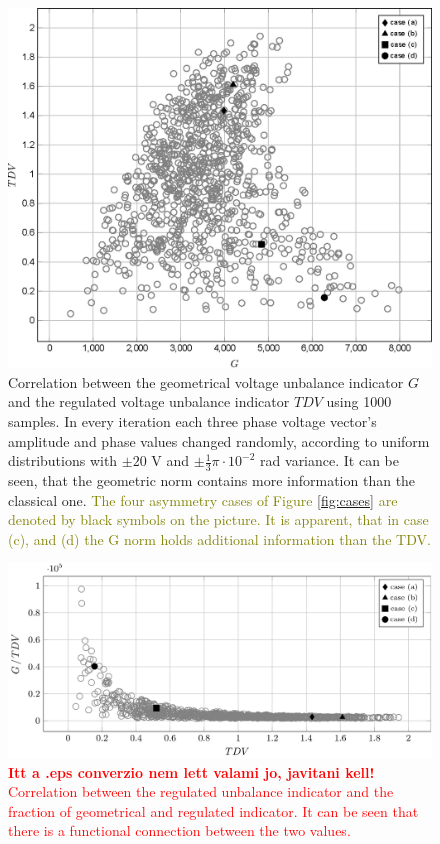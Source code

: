             \begin{figure}[!ht]
           \centering
           \includegraphics[width=\textwidth,scale=0.95]{Unblance_EPS_Pics/EPS_images/scatter.eps}
           \caption{Correlation between the geometrical voltage unbalance indicator $G$ and the regulated voltage unbalance indicator $TDV$ using 1000 samples. In every iteration each three phase voltage vector's amplitude and phase values changed randomly, according to uniform distributions with $\pm20$ V and $\pm\frac{1}{3}\pi\cdot10^{-2}$ rad variance. It can be seen, that the geometric norm contains more information than the classical one. \textcolor{olive}{The  four asymmetry cases of Figure \ref{fig:cases} are denoted by black symbols on the picture. It is apparent, that in case (c), and (d) the G norm holds additional information than the TDV.}}
           \label{fig:correlation}
            \end{figure}

            \begin{figure}[!ht]
           \centering
           \includegraphics[width=\textwidth,scale=0.95]{Unblance_EPS_Pics/EPS_images/side_scatter.eps}
           \caption{\textcolor{red}{\textbf{Itt a .eps converzio nem lett valami jo, javitani kell!} Correlation between the regulated unbalance indicator and the fraction of geometrical and regulated indicator. It can be seen that there is a functional connection between the two values.}}
           \label{fig:side_correlation}
            \end{figure}



